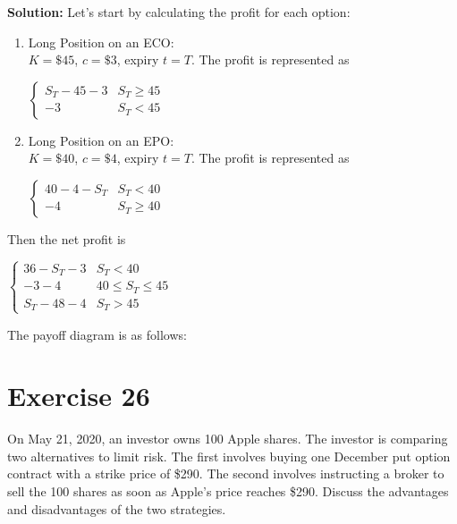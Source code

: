\documentclass{article}
\begin{document}
\textbf{Solution:} Let's start by calculating the profit for each option: \\
\begin{enumerate}
    \item Long Position on an ECO: \\
    $K = \$45$, $c = \$3$, expiry $t=T$. The profit is represented as
    \begin{center}
        $\begin{cases}
            S_T - 45 - 3 & S_T \geq 45 \\
            -3 & S_T < 45
        \end{cases}$
    \end{center}
    
    \item Long Position on an EPO: \\
    $K = \$40$, $c = \$4$, expiry $t=T$. The profit is represented as
    \begin{center}
        $\begin{cases}
            40-4-S_T & S_T < 40 \\
            -4 & S_T \geq 40
        \end{cases}$
    \end{center}
\end{enumerate}
Then the net profit is 
\begin{center}
    $\begin{cases}
        36-S_T-3 & S_T < 40 \\
        -3-4 & 40 \leq S_T \leq 45 \\
        S_T - 48 - 4 & S_T > 45
    \end{cases}$
\end{center}
The payoff diagram is as follows:
\begin{center}
\end{center}

\section*{Exercise 26}
On May 21, 2020, an investor owns 100 Apple shares. The
investor is comparing two alternatives to limit risk. The first involves buying one December put option contract
with a strike price of \$290. The second involves instructing a broker to sell the 100 shares as soon as Apple’s
price reaches \$290. Discuss the advantages and disadvantages of the two strategies. \\
\end{document}
